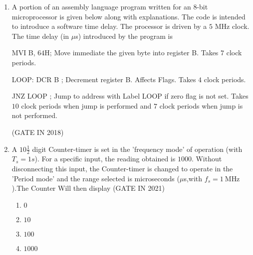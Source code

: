 
\begin{enumerate}

\item
\label{prob:gate IN 45}
 A portion of an assembly language program written for an $8$-bit microprocessor is given below along with explanations. The code is intended to introduce a software time delay. The processor is driven by a $5$ MHz clock. The time delay (in $\mu$s) introduced by the program is \vspace{12 pt}


MVI B, $64$H; Move immediate the given byte into register B. Takes $7$ clock periods.\vspace{12 pt}


LOOP: DCR B ; Decrement register B. Affects Flags. Takes $4$ clock periods. \vspace{12 pt}


JNZ LOOP ; Jump to address with Label LOOP if zero flag is not set. Takes $10$ clock periods when jump is performed and $7$ clock periods when jump is not performed.

\hfill(GATE IN 2018)

\item A $10\frac{1}{2}$ digit Counter-timer is set in the 'frequency mode' of operation (with $T_s=1s$). For a specific input, the reading obtained is $1000$. Without disconnecting this input, the Counter-timer is changed to operate in the 'Period mode' and the range selected is microseconds ($\mu$s,with $f_s=\SI{1}{\mega\hertz}$).The Counter Will then display
\hfill(GATE IN 2021)
\begin{enumerate}
  \item $0$
  \item $10$
  \item $100$
  \item $1000$
\end{enumerate}

\end{enumerate}
